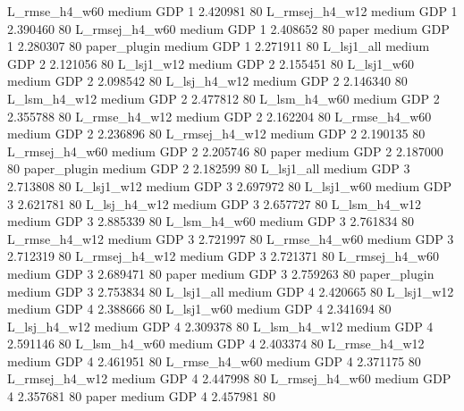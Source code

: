 L_rmse_h4_w60     medium      GDP                 1 2.420981 80
L_rmsej_h4_w12     medium      GDP                 1 2.390460 80
L_rmsej_h4_w60     medium      GDP                 1 2.408652 80
         paper     medium      GDP                 1 2.280307 80
  paper_plugin     medium      GDP                 1 2.271911 80
    L_lsj1_all     medium      GDP                 2 2.121056 80
    L_lsj1_w12     medium      GDP                 2 2.155451 80
    L_lsj1_w60     medium      GDP                 2 2.098542 80
  L_lsj_h4_w12     medium      GDP                 2 2.146340 80
  L_lsm_h4_w12     medium      GDP                 2 2.477812 80
  L_lsm_h4_w60     medium      GDP                 2 2.355788 80
 L_rmse_h4_w12     medium      GDP                 2 2.162204 80
 L_rmse_h4_w60     medium      GDP                 2 2.236896 80
L_rmsej_h4_w12     medium      GDP                 2 2.190135 80
L_rmsej_h4_w60     medium      GDP                 2 2.205746 80
         paper     medium      GDP                 2 2.187000 80
  paper_plugin     medium      GDP                 2 2.182599 80
    L_lsj1_all     medium      GDP                 3 2.713808 80
    L_lsj1_w12     medium      GDP                 3 2.697972 80
    L_lsj1_w60     medium      GDP                 3 2.621781 80
  L_lsj_h4_w12     medium      GDP                 3 2.657727 80
  L_lsm_h4_w12     medium      GDP                 3 2.885339 80
  L_lsm_h4_w60     medium      GDP                 3 2.761834 80
 L_rmse_h4_w12     medium      GDP                 3 2.721997 80
 L_rmse_h4_w60     medium      GDP                 3 2.712319 80
L_rmsej_h4_w12     medium      GDP                 3 2.721371 80
L_rmsej_h4_w60     medium      GDP                 3 2.689471 80
         paper     medium      GDP                 3 2.759263 80
  paper_plugin     medium      GDP                 3 2.753834 80
    L_lsj1_all     medium      GDP                 4 2.420665 80
    L_lsj1_w12     medium      GDP                 4 2.388666 80
    L_lsj1_w60     medium      GDP                 4 2.341694 80
  L_lsj_h4_w12     medium      GDP                 4 2.309378 80
  L_lsm_h4_w12     medium      GDP                 4 2.591146 80
  L_lsm_h4_w60     medium      GDP                 4 2.403374 80
 L_rmse_h4_w12     medium      GDP                 4 2.461951 80
 L_rmse_h4_w60     medium      GDP                 4 2.371175 80
L_rmsej_h4_w12     medium      GDP                 4 2.447998 80
L_rmsej_h4_w60     medium      GDP                 4 2.357681 80
         paper     medium      GDP                 4 2.457981 80
